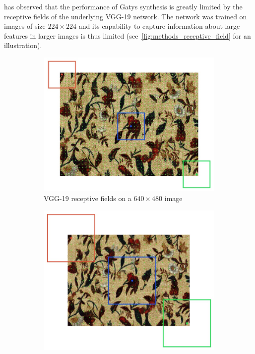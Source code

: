\citet{Snelgrove2017} has observed that the performance of Gatys synthesis is greatly limited by the receptive fields of the underlying VGG-19 network. The network was trained on images of size \(224 \times 224\) and its capability to capture information about large features in larger images is thus limited (see~\ref{fig:methods_receptive_field} for an illustration).

\begin{figure}[ht]
    \centering
    \begin{subfigure}[b]{0.48\textwidth}
        \centering
        \includegraphics[width=\textwidth]{images/03-receptive_field-level0.jpg}
        \caption{VGG-19 receptive fields on a \(640 \times 480\) image}
        \label{fig:methods_receptive_field_lvl0}
    \end{subfigure}
    \hfill
    \begin{subfigure}[b]{0.48\textwidth}
        \centering
        \includegraphics[width=\textwidth]{images/03-receptive_field-level1.jpg}

\end{subfigure}
\end{figure}
